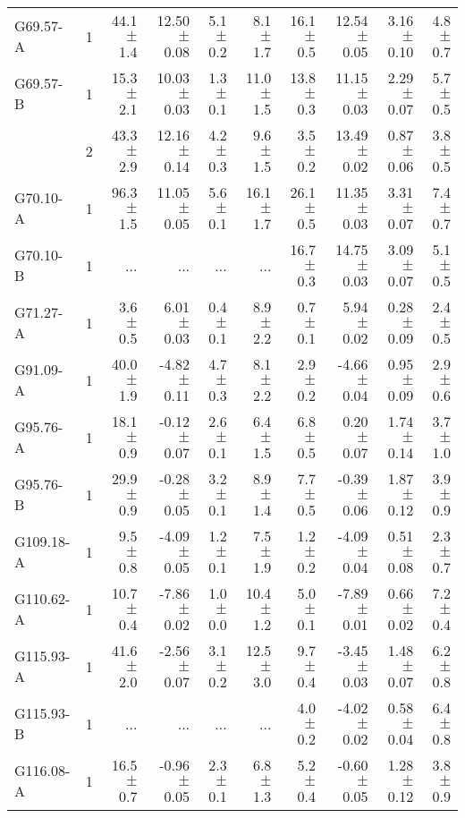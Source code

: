 \documentclass[printer]{aa}
\begin{document}
\begin{table*}[h]
\begin{tabular}{l c r r r r r r r r}
G69.57-A & 1 &  44.1 $\pm$ 1.4 &  12.50 $\pm$ 0.08 & 5.1 $\pm$ 0.2 &  8.1 $\pm$  1.7 & 16.1 $\pm$ 0.5 &  12.54 $\pm$ 0.05 & 3.16 $\pm$ 0.10 &  4.8 $\pm$ 0.7 \\
G69.57-B & 1 &  15.3 $\pm$ 2.1 &  10.03 $\pm$ 0.03 & 1.3 $\pm$ 0.1 & 11.0 $\pm$  1.5 & 13.8 $\pm$ 0.3 &  11.15 $\pm$ 0.03 & 2.29 $\pm$ 0.07 &  5.7 $\pm$ 0.5 \\
 & 2 &  43.3 $\pm$ 2.9 &  12.16 $\pm$ 0.14 & 4.2 $\pm$ 0.3 &  9.6 $\pm$  1.5 &  3.5 $\pm$ 0.2 &  13.49 $\pm$ 0.02 & 0.87 $\pm$ 0.06 &  3.8 $\pm$ 0.5 \\
G70.10-A & 1 &  96.3 $\pm$ 1.5 &  11.05 $\pm$ 0.05 & 5.6 $\pm$ 0.1 & 16.1 $\pm$  1.7 & 26.1 $\pm$ 0.5 &  11.35 $\pm$ 0.03 & 3.31 $\pm$ 0.07 &  7.4 $\pm$ 0.7 \\
G70.10-B & 1 &   ... &   ... & ... &  ... & 16.7 $\pm$ 0.3 &  14.75 $\pm$ 0.03 & 3.09 $\pm$ 0.07 &  5.1 $\pm$ 0.5 \\
G71.27-A & 1 &   3.6 $\pm$ 0.5 &   6.01 $\pm$ 0.03 & 0.4 $\pm$ 0.1 &  8.9 $\pm$  2.2 &  0.7 $\pm$ 0.1 &   5.94 $\pm$ 0.02 & 0.28 $\pm$ 0.09 &  2.4 $\pm$ 0.5 \\
G91.09-A & 1 &  40.0 $\pm$ 1.9 &  -4.82 $\pm$ 0.11 & 4.7 $\pm$ 0.3 &  8.1 $\pm$  2.2 &  2.9 $\pm$ 0.2 &  -4.66 $\pm$ 0.04 & 0.95 $\pm$ 0.09 &  2.9 $\pm$ 0.6 \\
G95.76-A & 1 &  18.1 $\pm$ 0.9 &  -0.12 $\pm$ 0.07 & 2.6 $\pm$ 0.1 &  6.4 $\pm$  1.5 &  6.8 $\pm$ 0.5 &   0.20 $\pm$ 0.07 & 1.74 $\pm$ 0.14 &  3.7 $\pm$ 1.0 \\
G95.76-B & 1 &  29.9 $\pm$ 0.9 &  -0.28 $\pm$ 0.05 & 3.2 $\pm$ 0.1 &  8.9 $\pm$  1.4 &  7.7 $\pm$ 0.5 &  -0.39 $\pm$ 0.06 & 1.87 $\pm$ 0.12 &  3.9 $\pm$ 0.9 \\
G109.18-A & 1 &   9.5 $\pm$ 0.8 &  -4.09 $\pm$ 0.05 & 1.2 $\pm$ 0.1 &  7.5 $\pm$  1.9 &  1.2 $\pm$ 0.2 &  -4.09 $\pm$ 0.04 & 0.51 $\pm$ 0.08 &  2.3 $\pm$ 0.7 \\
G110.62-A & 1 &  10.7 $\pm$ 0.4 &  -7.86 $\pm$ 0.02 & 1.0 $\pm$ 0.0 & 10.4 $\pm$  1.2 &  5.0 $\pm$ 0.1 &  -7.89 $\pm$ 0.01 & 0.66 $\pm$ 0.02 &  7.2 $\pm$ 0.4 \\
G115.93-A & 1 &  41.6 $\pm$ 2.0 &  -2.56 $\pm$ 0.07 & 3.1 $\pm$ 0.2 & 12.5 $\pm$  3.0 &  9.7 $\pm$ 0.4 &  -3.45 $\pm$ 0.03 & 1.48 $\pm$ 0.07 &  6.2 $\pm$ 0.8 \\
G115.93-B & 1 &   ... &   ... & ... &  ... &  4.0 $\pm$ 0.2 &  -4.02 $\pm$ 0.02 & 0.58 $\pm$ 0.04 &  6.4 $\pm$ 0.8 \\
G116.08-A & 1 &  16.5 $\pm$ 0.7 &  -0.96 $\pm$ 0.05 & 2.3 $\pm$ 0.1 &  6.8 $\pm$  1.3 &  5.2 $\pm$ 0.4 &  -0.60 $\pm$ 0.05 & 1.28 $\pm$ 0.12 &  3.8 $\pm$ 0.9 \\

\end{tabular}
\end{table*}
\end{document}
